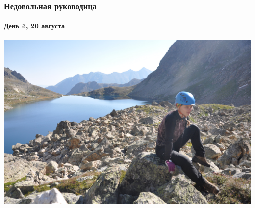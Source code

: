 \begin{frame}
	\frametitle{Недовольная руководица}
	\framesubtitle{День 3, 20 августа}
	\centering
	\includegraphics[width=\textwidth]{../pics/DSC_0846}			
\end{frame}

